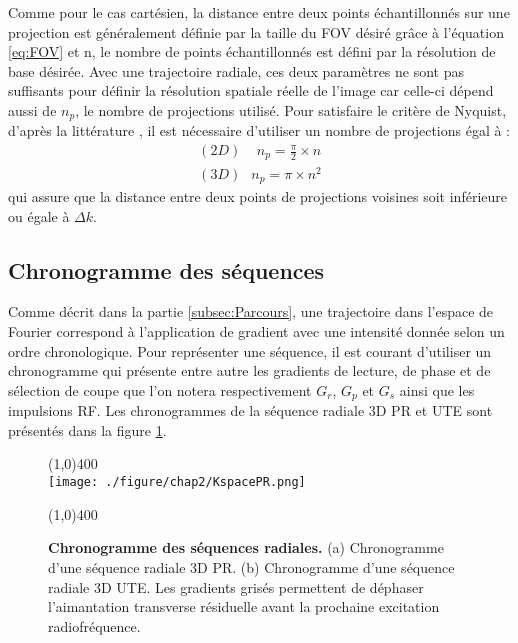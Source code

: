Comme pour le cas cartésien, la distance entre deux points échantillonnés sur une projection est généralement définie par la taille du FOV désiré grâce à l'équation \ref{eq:FOV} et n, le nombre de points échantillonnés est défini par la résolution de base désirée. Avec une trajectoire radiale, ces deux paramètres ne sont pas suffisants pour définir la résolution spatiale réelle de l'image car celle-ci dépend aussi de $n_p$, le nombre de projections utilisé. Pour satisfaire le critère de Nyquist, d'après la littérature \cite{bernstein2004handbook}, il est nécessaire d'utiliser un nombre de projections égal à :
\begin{equation}
\label{eq:NyquistRad}
\begin{aligned}
	(2D)\;\;\;\; n_p = \frac{\pi}{2} \times n \\
	(3D)\;\ \ n_p = \pi \times n^2 
\end{aligned}
\end{equation}
qui assure que la distance entre deux points de projections voisines soit inférieure ou égale à $\Delta k$.

\subsection{Chronogramme des séquences}

Comme décrit dans la partie \ref{subsec:Parcours}, une trajectoire dans l'espace de Fourier correspond à l'application de gradient avec une intensité donnée selon un ordre chronologique. Pour représenter une séquence, il est courant d'utiliser un chronogramme qui présente entre autre les gradients de lecture, de phase et de sélection de coupe que l'on notera respectivement $G_r$, $G_p$ et $G_s$ ainsi que les impulsions RF. Les chronogrammes de la séquence radiale 3D PR et UTE sont présentés dans la figure \ref{fig:KspacePR}.

\begin{figure}[h]
\centering
\line(1,0){400} \\
\texttt{[image: ./figure/chap2/KspacePR.png]}
\caption[Chronogramme des séquences radiales.]{\label{fig:KspacePR} \textbf{Chronogramme des séquences radiales.} (a) Chronogramme d'une séquence radiale 3D PR. (b) Chronogramme d'une séquence radiale 3D UTE. Les gradients grisés permettent de déphaser l'aimantation transverse résiduelle avant la prochaine excitation radiofréquence.} 
\line(1,0){400} \\
\end{figure}

